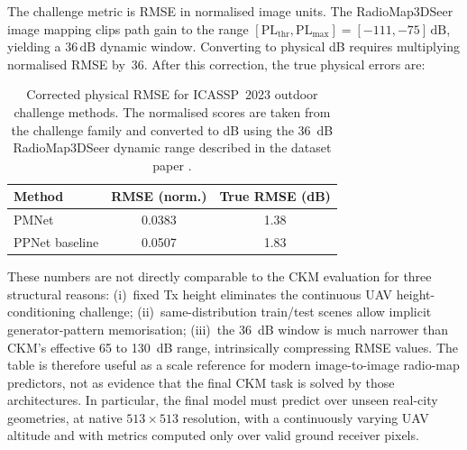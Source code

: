 The challenge metric is RMSE in normalised image units.  The RadioMap3DSeer
image mapping clips path gain to the range
$[\mathrm{PL}_{\mathrm{thr}}, \mathrm{PL}_{\mathrm{max}}] = [-111, -75]\,\mathrm{dB}$,
yielding a $36\,\mathrm{dB}$ dynamic window.  Converting to physical dB requires
multiplying normalised RMSE by~36.  After this correction, the true physical
errors are:

\begin{table}[ht]
\centering
\caption[Corrected ICASSP 2023 outdoor RMSE.]%
{Corrected physical RMSE for ICASSP~2023 outdoor challenge methods.
The normalised scores are taken from the challenge family and converted to dB
using the \SI{36}{dB} RadioMap3DSeer dynamic range described in the dataset
paper \cite{icassp2023challenge,dataset2212}.\protect\footnotemark}
\label{tab:icassp2023corrected}
\begin{tabular}{lcc}
\toprule
\textbf{Method} & \textbf{RMSE (norm.)} & \textbf{True RMSE (dB)} \\
\midrule
PMNet \cite{pmnet2023} & 0.0383 & 1.38 \\
PPNet baseline \cite{icassp2023challenge} & 0.0507 & 1.83 \\
\bottomrule
\end{tabular}
\end{table}

These numbers are not directly comparable to the CKM evaluation for three
structural reasons: (i)~fixed Tx height eliminates the continuous UAV
height-conditioning challenge; (ii)~same-distribution train/test scenes allow
implicit generator-pattern memorisation; (iii)~the 36~dB window is much narrower
than CKM's effective 65 to 130~dB range, intrinsically compressing RMSE values.
The table is therefore useful as a scale reference for modern image-to-image
radio-map predictors, not as evidence that the final CKM task is solved by those
architectures. In particular, the final model must predict over unseen real-city
geometries, at native \(513\times513\) resolution, with a continuously varying
UAV altitude and with metrics computed only over valid ground receiver pixels.

